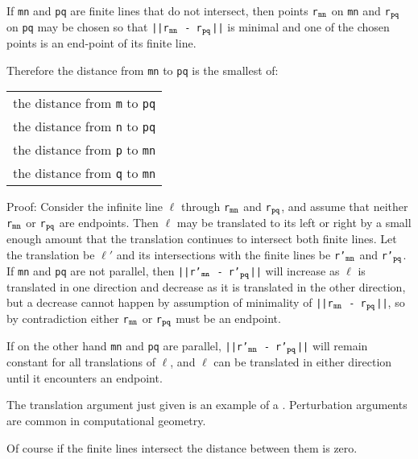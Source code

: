 \documentclass[12pt]{article}
\begin{document}
\begin{theorem}
\label{FINITE-LINE-DISTANCE-THEOREM}
If {\tt mn} and {\tt pq} are finite lines that do not intersect, then
points {\tt r$_{\tt mn}$} on {\tt mn} and
{\tt r$_{\tt pq}$} on {\tt pq} may be chosen so that
{\tt ||r$_{\tt mn}$ - r$_{\tt pq}$||} is minimal and
one of the chosen points is an end-point of its finite line.

Therefore the distance from {\tt mn} to {\tt pq} is the
smallest of: \\
\hspace*{0.5in}\begin{tabular}{l}
the distance from {\tt m} to {\tt pq} \\
the distance from {\tt n} to {\tt pq} \\
the distance from {\tt p} to {\tt mn} \\
the distance from {\tt q} to {\tt mn} \\
\end{tabular}
\end{theorem}

\begin{indpar}{0.3in}
Proof:  Consider the infinite line $\ell$ through
{\tt r$_{\tt mn}$} and {\tt r$_{\tt pq}$}, and assume that
neither
{\tt r$_{\tt mn}$} or {\tt r$_{\tt pq}$} are endpoints.
Then $\ell$ may be translated to its left or right by
a small enough amount that the translation continues
to intersect both finite lines.  Let the translation
be $\ell'$ and its intersections with the finite lines be
{\tt r'$_{\tt mn}$} and {\tt r'$_{\tt pq}$}.
If {\tt mn} and {\tt pq} are not parallel, then
{\tt ||r'$_{\tt mn}$ - r'$_{\tt pq}$||} will increase
as $\ell$ is translated in one direction and decrease as
it is translated in the other direction, but a decrease
cannot happen by assumption of minimality of
{\tt ||r$_{\tt mn}$ - r$_{\tt pq}$||}, so by contradiction either
{\tt r$_{\tt mn}$} or {\tt r$_{\tt pq}$} must be an endpoint.

If on the other hand {\tt mn} and {\tt pq} are parallel,
{\tt ||r'$_{\tt mn}$ - r'$_{\tt pq}$||} will remain constant
for all translations of $\ell$, and $\ell$ can be translated
in either direction until it encounters an endpoint.
\end{indpar}

The translation argument just given is an example of a
.  Perturbation arguments are common
in computational geometry.

Of course if the finite lines intersect the distance between
them is zero.
\end{document}
